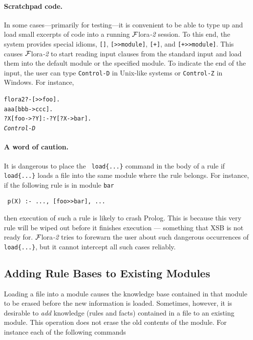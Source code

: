 \documentclass[11pt]{article}
\newcommand{\FLORA}{{\mbox{\sc ${\cal F}${lora}\rm\emph{-2}}}\xspace}
\newcommand{\FLSYSTEM}{\FLORA}
\newcommand{\prompt}{flora2 ?- }
\begin{document}
\paragraph{Scratchpad code.}
In some cases---primarily for testing---it is convenient to be able to type
up and load small excerpts of code into a running \FLSYSTEM session.
To this end, the system provides special idioms, \verb|[]|,
\verb|[>>module]|, \verb|[+]|, and \verb|[+>>module]|. This causes
\FLSYSTEM to start reading input clauses
from the standard input and load them into the default module or the
specified module. To indicate the end of the input, the user can type
{\tt Control-D} in Unix-like systems or {\tt Control-Z} in Windows.  
For instance,

\begin{alltt}
 \prompt [>{}>foo].
 aaa[bbb->ccc].
 ?X[foo->?Y] :- ?Y[?X->bar].
 \emph{Control-D}  
\end{alltt}


\paragraph{A word of caution.} It is dangerous to place the {\tt
  load\{...\}} command
in the body of a rule if {\tt load\{...\}} loads a file into the same module
where the rule belongs. For instance, if the following rule is in module
{\tt bar}  
\begin{verbatim}
 p(X) :- ..., [foo>>bar], ...  
\end{verbatim}
then execution of such a rule is likely to crash Prolog. This is because
this very rule will be wiped out before it finishes execution --- something
that XSB is not ready for. \FLSYSTEM tries to forewarn the user about such
dangerous occurrences of {\tt load\{...\}}, but it cannot intercept all such
cases reliably.


\subsection{Adding Rule Bases to Existing Modules}

Loading a file into a module causes the knowledge base contained in that
module to be erased before the new information is loaded. Sometimes,
however, it is desirable to \emph{add} knowledge (rules and facts)
contained in a file to an existing module.
This operation does not erase the old contents of the module.
For instance each of the following commands 
\end{document}
